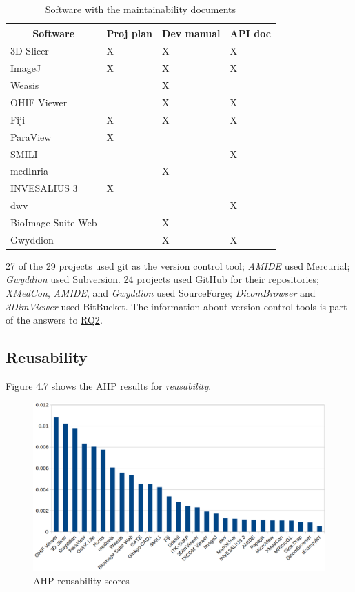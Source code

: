 \documentclass[preprint,12pt,authoryear]{elsarticle}
\begin{document}
\begin{table}[ht]
\centering
\begin{tabular}{llll}
\hline
\multicolumn{1}{c}{Software} & Proj plan & Dev manual & API doc \\ \hline
3D Slicer & X & X & X \\
ImageJ & X & X & X \\
Weasis &  & X &  \\
OHIF Viewer &  & X & X \\
Fiji & X & X & X \\
ParaView & X &  &  \\
SMILI &  &  & X \\
medInria &  & X &  \\
INVESALIUS 3 & X &  &  \\
dwv &  &  & X \\
BioImage Suite Web &  & X &  \\
Gwyddion &  & X & X \\ \hline
\end{tabular}
\caption{\label{tab_maintainability_docs}Software with the maintainability documents}
\end{table}

27 of the 29 projects used git as the version control tool; \textit{AMIDE} used
Mercurial; \textit{Gwyddion} used Subversion. 24 projects used GitHub for their
repositories; \textit{XMedCon}, \textit{AMIDE}, and \textit{Gwyddion} used
SourceForge; \textit{DicomBrowser} and \textit{3DimViewer} used BitBucket. The
information about version control tools is part of the answers to
\hyperlink{rq2}{RQ2}.

\subsection{Reusability} \label{sec_result_reusability}

Figure 4.7 shows the AHP results for \textit{reusability}.

\begin{figure}[ht]
\includegraphics[scale=0.38]{figures/reusability_scores.png}
\caption{AHP reusability scores}
\label{fg_reusability_scores}
\end{figure}
\end{document}
